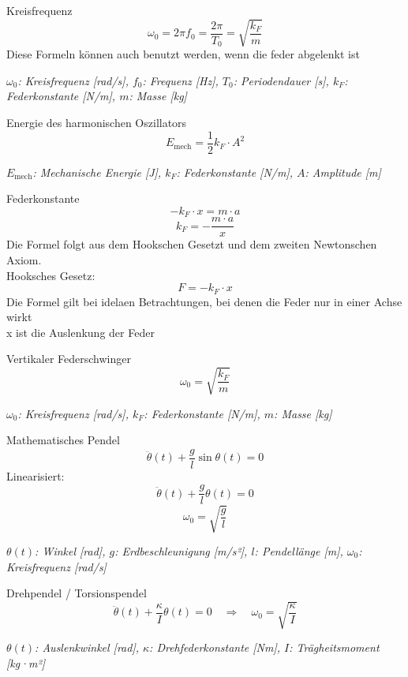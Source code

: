 \documentclass[a4paper,10pt]{article}
\newenvironment{displayformula}
{
	\begin{framed}
		\color{formulaColor}
	}
	{\end{framed}}
\newcommand{\formulalegend}[1]{%
	\par\vspace{0.5ex}%
	{{\color{legendColor}\RaggedRight\small\textit{#1}}}%
	\par\vspace{1.5ex}%
}
\begin{document}
\begin{displayformula}
	Kreisfrequenz
	\[
	\omega_0 = 2\pi f_0 = \frac{2\pi}{T_0} = \sqrt{\frac{k_F}{m}}
	\]
	Diese Formeln können auch benutzt werden, wenn die feder abgelenkt ist
\end{displayformula}
\formulalegend{
	\( \omega_0 \): Kreisfrequenz [rad/s], \( f_0 \): Frequenz [Hz], \( T_0 \): Periodendauer [s], \( k_F \): Federkonstante [N/m], \( m \): Masse [kg]
}

\begin{displayformula}
	Energie des harmonischen Oszillators
	\[
	E_{\text{mech}} = \frac{1}{2} k_F \cdot A^2
	\]
\end{displayformula}
\formulalegend{
	\( E_{\text{mech}} \): Mechanische Energie [J], \( k_F \): Federkonstante [N/m], \( A \): Amplitude [m]
}

\begin{displayformula}
	Federkonstante
	\[
	-k_F \cdot x = m \cdot a
	\]
	\[
	k_F = - \frac{m \cdot a}{x}
	\]
	Die Formel folgt aus dem Hookschen Gesetzt und dem zweiten Newtonschen Axiom. \\ Hooksches Gesetz:
	\[
	F = -k_F \cdot x
	\]
	Die Formel gilt bei idelaen Betrachtungen, bei denen die Feder nur in einer Achse wirkt \\ x ist die Auslenkung der Feder
\end{displayformula}

\begin{displayformula}
	Vertikaler Federschwinger
	\[
	\omega_0 = \sqrt{\frac{k_F}{m}}
	\]
\end{displayformula}
\formulalegend{
	\( \omega_0 \): Kreisfrequenz [rad/s], \( k_F \): Federkonstante [N/m], \( m \): Masse [kg]
}

\begin{displayformula}
	Mathematisches Pendel
	\[
	\ddot{\theta}(t) + \frac{g}{l} \sin\theta(t) = 0
	\]
	Linearisiert:
	\[
	\ddot{\theta}(t) + \frac{g}{l} \theta(t) = 0
	\]
	\[
	\omega_0 = \sqrt{\frac{g}{l}}
	\]
\end{displayformula}
\formulalegend{
	\( \theta(t) \): Winkel [rad], \( g \): Erdbeschleunigung [m/s²], \( l \): Pendellänge [m], \( \omega_0 \): Kreisfrequenz [rad/s]
}

\begin{displayformula}
	Drehpendel / Torsionspendel
	\[
	\ddot{\theta}(t) + \frac{\kappa}{I} \theta(t) = 0
	\quad \Rightarrow \quad \omega_0 = \sqrt{\frac{\kappa}{I}}
	\]
\end{displayformula}
\formulalegend{
	\( \theta(t) \): Auslenkwinkel [rad], \( \kappa \): Drehfederkonstante [Nm], \( I \): Trägheitsmoment [kg·m²]
}
\end{document}

